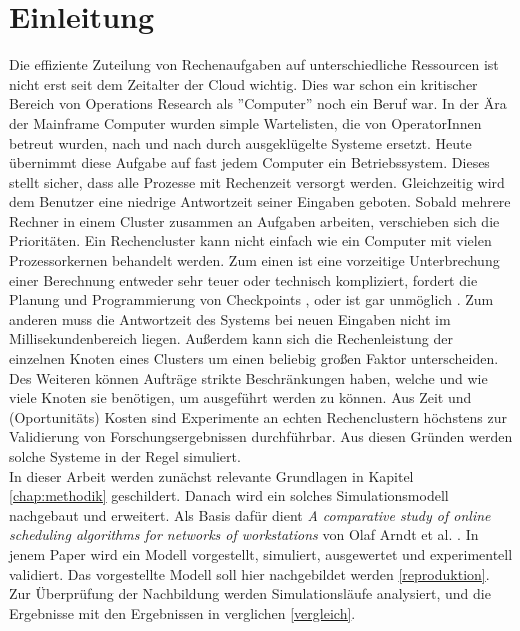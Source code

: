 \chapter{Einleitung}
\label{chap:ein}


Die effiziente Zuteilung von Rechenaufgaben auf unterschiedliche Ressourcen ist nicht erst seit dem Zeitalter der Cloud wichtig. Dies war schon ein kritischer Bereich von Operations Research
als ''Computer'' noch ein Beruf war.
In der Ära der Mainframe Computer wurden simple Wartelisten, die von OperatorInnen betreut wurden, nach und nach durch ausgeklügelte Systeme ersetzt. %
Heute übernimmt diese Aufgabe auf fast jedem Computer ein Betriebssystem. Dieses stellt sicher, dass alle Prozesse mit Rechenzeit versorgt werden. Gleichzeitig wird dem Benutzer eine niedrige Antwortzeit seiner Eingaben geboten. Sobald mehrere Rechner in einem Cluster zusammen an Aufgaben arbeiten, verschieben sich die Prioritäten. Ein Rechencluster kann nicht einfach wie ein Computer mit vielen Prozessorkernen behandelt werden. Zum einen ist eine vorzeitige Unterbrechung einer Berechnung entweder sehr teuer oder technisch kompliziert, fordert die Planung und Programmierung von Checkpoints \cite{IPS15}, oder ist gar unmöglich \cite{adams1979hitchhiker}.
Zum anderen muss die Antwortzeit des Systems bei neuen Eingaben nicht im Millisekundenbereich liegen.
Außerdem kann sich die Rechenleistung der einzelnen Knoten eines Clusters um einen beliebig großen Faktor unterscheiden.
Des Weiteren können Aufträge strikte Beschränkungen haben, welche und  wie viele Knoten sie benötigen, um ausgeführt werden zu können. Aus Zeit und (Oportunitäts) Kosten sind Experimente an echten Rechenclustern höchstens zur Validierung von Forschungsergebnissen durchführbar. Aus diesen Gründen werden solche Systeme in der Regel simuliert.\\
In dieser Arbeit werden zunächst relevante Grundlagen in Kapitel \ref{chap:methodik} geschildert.
Danach wird ein solches Simulationsmodell nachgebaut und erweitert. Als Basis dafür dient \emph{A comparative study of online scheduling algorithms for networks of workstations} von Olaf Arndt et al. \cite{Arn99}. In jenem Paper wird ein Modell vorgestellt, simuliert, ausgewertet und experimentell validiert. Das vorgestellte Modell soll hier nachgebildet werden \ref{reproduktion}. Zur Überprüfung der Nachbildung werden Simulationsläufe analysiert, und die Ergebnisse mit den Ergebnissen in \cite{Arn99} verglichen \ref{vergleich}.\\
